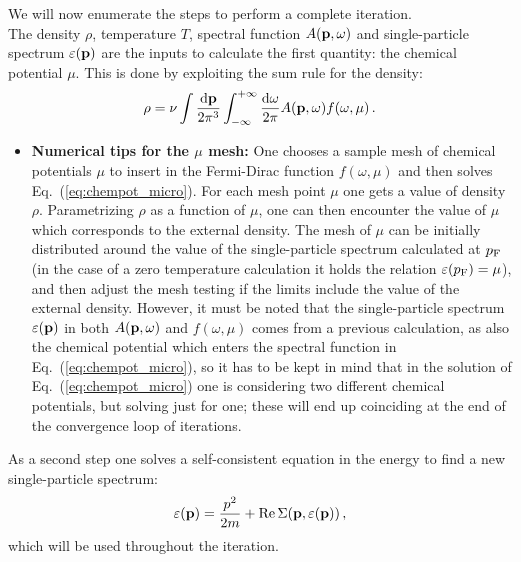 We will now enumerate the steps to perform a complete iteration.\\
 The density $\rho$, temperature $T$, spectral function $A({\bf p},\omega)$ and single-particle spectrum $\varepsilon({\bf p})$ are the inputs to calculate the first quantity: the chemical potential $\mu$. This is done by exploiting the sum rule for the density:
\begin{equation}
\rho=\nu\int\frac{{\rm d}{\bf p}}{2\pi^3}\int_{-\infty}^{+\infty}\frac{{\rm d}{\omega}}{2\pi}A({\bf p},\omega)f(\omega,\mu)\,.
\label{eq:chempot_micro}
\end{equation}
\begin{itemize}
\item {\bf Numerical tips for the $\mu$ mesh:} One chooses a sample mesh of chemical potentials $\mu$ to insert in the Fermi-Dirac function $f(\omega,\mu)$ and then solves Eq.~(\ref{eq:chempot_micro}). For each mesh point $\mu$ one gets a value of density $\rho$. Parametrizing $\rho$ as a function of $\mu$, one can then encounter the value of $\mu$ which corresponds to the external density. The mesh of $\mu$ can be initially distributed around the value of the single-particle spectrum calculated at $p_{\rm F}$ (in the case of a zero temperature calculation it holds the relation $\varepsilon(p_{\rm F})=\mu$), and then adjust the mesh testing if the limits include the value of the external density. However, it must be noted that the single-particle spectrum $\varepsilon({\bf p})$ in both $A({\bf p},\omega)$ and $f(\omega,\mu)$ comes from a previous calculation, as also the chemical potential which enters the spectral function in Eq.~(\ref{eq:chempot_micro}), so it has to be kept in mind that in the solution of Eq.~(\ref{eq:chempot_micro}) one is considering two different chemical potentials, but solving just for one; these will end up coinciding at the end of the convergence loop of iterations.
\end{itemize}

 As a second step one solves a self-consistent equation in the energy to find a new single-particle spectrum:
\begin{equation}
\varepsilon({\bf p})=\frac{p^2}{2m}+{\rm Re} \, \Sigma({\bf p},\varepsilon({\bf p}))\,,
\end{equation}
which will be used throughout the iteration. 
 
